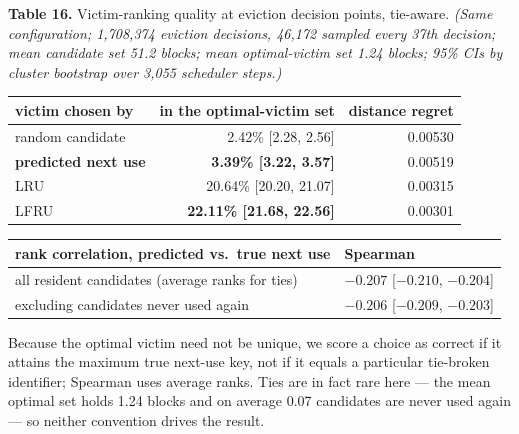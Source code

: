 \documentclass[
  10pt,
  letterpaper,
  10pt]{article}
\newcounter{none} %
\begin{document}
\textbf{Table 16.} Victim-ranking quality at eviction decision points,
tie-aware. \emph{(Same configuration; 1,708,374 eviction decisions,
46,172 sampled every 37th decision; mean candidate set 51.2 blocks; mean
optimal-victim set 1.24 blocks; 95\% CIs by cluster bootstrap over 3,055
scheduler steps.)}

{\def\LTcaptype{none} %
\begin{longtable}[]{@{}lrr@{}}
\toprule\noalign{}
victim chosen by & in the optimal-victim set & distance regret \\
\midrule\noalign{}
\endhead
\bottomrule\noalign{}
\endlastfoot
random candidate & 2.42\% {[}2.28, 2.56{]} & 0.00530 \\
\textbf{predicted next use} & \textbf{3.39\% {[}3.22, 3.57{]}} &
0.00519 \\
LRU & 20.64\% {[}20.20, 21.07{]} & 0.00315 \\
LFRU & \textbf{22.11\% {[}21.68, 22.56{]}} & 0.00301 \\
\end{longtable}
}

{\def\LTcaptype{none} %
\begin{longtable}[]{@{}
  >{\raggedright\arraybackslash}p{}
  >{\raggedleft\arraybackslash}p{}@{}}
\toprule\noalign{}
\begin{minipage}[b]{\linewidth}\raggedright
rank correlation, predicted vs.~true next use
\end{minipage} & \begin{minipage}[b]{\linewidth}\raggedleft
Spearman
\end{minipage} \\
\midrule\noalign{}
\endhead
\bottomrule\noalign{}
\endlastfoot
all resident candidates (average ranks for ties) & \(-0.207\)
{[}\(-0.210\), \(-0.204\){]} \\
excluding candidates never used again & \(-0.206\) {[}\(-0.209\),
\(-0.203\){]} \\
\end{longtable}
}

Because the optimal victim need not be unique, we score a choice as
correct if it attains the maximum true next-use key, not if it equals a
particular tie-broken identifier; Spearman uses average ranks. Ties are
in fact rare here --- the mean optimal set holds 1.24 blocks and on
average 0.07 candidates are never used again --- so neither convention
drives the result.
\end{document}
